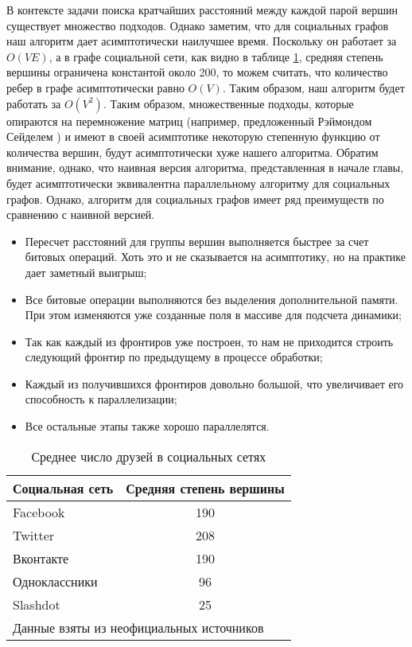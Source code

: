 В контексте задачи поиска кратчайших расстояний между каждой парой вершин существует множество подходов. Однако заметим, что для социальных графов наш алгоритм дает асимптотически наилучшее время. Поскольку он работает за $O(VE)$, а в графе социальной сети, как видно в таблице \ref{table:algo_floyd_avg_vertex_degree}, средняя степень вершины ограничена константой около 200, то можем считать, что количество ребер в графе асимптотически равно $O(V)$. Таким образом, наш алгоритм будет работать за $O(V^2)$. Таким образом, множественные подходы, которые опираются на перемножение матриц (например, предложенный Рэймондом Сейделем \cite{SEIDEL}) и имеют в своей асимптотике некоторую степенную функцию от количества вершин, будут асимптотически хуже нашего алгоритма. Обратим внимание, однако, что наивная версия алгоритма, представленная в начале главы, будет асимптотически эквивалентна параллельному алгоритму для социальных графов. Однако, алгоритм для социальных графов имеет ряд преимуществ по сравнению с наивной версией. 


\begin{itemize}
  \item Пересчет расстояний для группы вершин выполняется быстрее за счет битовых операций. Хоть это и не сказывается на асимптотику, но на практике дает заметный выигрыш; 
  \item Все битовые операции выполняются без выделения дополнительной памяти. При этом изменяются уже созданные поля в массиве для подсчета динамики;
  \item Так как каждый из фронтиров уже построен, то нам не приходится строить следующий фронтир по предыдущему в процессе обработки;
  \item Каждый из получившихся фронтиров довольно большой, что увеличивает его способность к параллелизации;
  \item Все остальные этапы также хорошо параллелятся.
\end{itemize}

\begin{table}[H]
\centering
\caption{Среднее число друзей в социальных сетях}

\begin{tabular}{l|c}  
\hline
Социальная сеть & Средняя степень вершины\\
\hline\hline
Facebook & 190 \\  
Twitter & 208  \\
Вконтакте & 190  \\
Одноклассники & 96  \\
Slashdot & 25  \\
\hline
\multicolumn{2}{l}{\footnotesize Данные взяты из неофициальных источников}\\
\end{tabular}
\label {table:algo_floyd_avg_vertex_degree}
\end{table}

